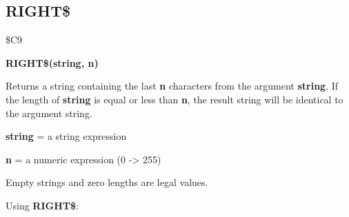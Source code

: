 
\newpage
\subsection{RIGHT\$}
\begin{description}[leftmargin=3cm,style=nextline]
\item [Token:] \$C9
\item [Format:] {\bf RIGHT\$(string, n)}
\item [Usage:] Returns a string
               containing the last {\bf n} characters from the
               argument {\bf string}.
               If the length of {\bf string} is equal or less than {\bf n},
               the result string will be identical to the argument string.

               {\bf string} = a string expression

               {\bf n} = a numeric expression (0 -> 255)

\item [Remarks:] Empty strings and zero lengths are legal values.

\item [Example:] Using {\bf RIGHT\$}:
\end{description}


\newpage
